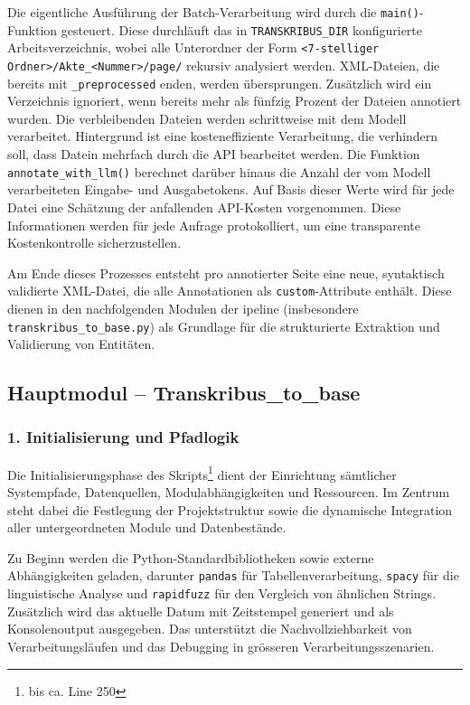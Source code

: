 \documentclass[12pt, a4paper, ngerman, bidi=default]{article}
\newcommand{\code}[1]{\colorbox{VeryLightGray}{\texttt{#1}}} %
\begin{document}
Die eigentliche Ausführung der Batch-Verarbeitung wird durch die \code{main()}-Funktion gesteuert. Diese durchläuft das in 
\code{TRANSKRIBUS\_DIR} konfigurierte Arbeitsverzeichnis, wobei alle Unterordner der Form \code{<7-stelliger Ordner>/Akte\_<Nummer>/page/} 
rekursiv analysiert werden. XML-Dateien, die bereits mit \code{\_preprocessed} enden, werden übersprungen. Zusätzlich wird ein Verzeichnis 
ignoriert, wenn bereits mehr als fünfzig Prozent der Dateien annotiert wurden. Die verbleibenden Dateien werden schrittweise mit dem Modell 
verarbeitet. Hintergrund ist eine kosteneffiziente Verarbeitung, die verhindern soll, dass Datein mehrfach durch die API bearbeitet werden. Die Funktion 
\code{annotate\_with\_llm()} berechnet darüber hinaus die Anzahl der vom Modell verarbeiteten Eingabe- und Ausgabetokens. Auf Basis dieser Werte wird für 
jede Datei eine Schätzung der anfallenden API-Kosten vorgenommen. Diese Informationen werden für jede Anfrage protokolliert, um eine transparente 
Kostenkontrolle sicherzustellen.

Am Ende dieses Prozesses entsteht pro annotierter Seite eine neue, syntaktisch validierte XML-Datei, 
die alle Annotationen als \code{custom}-Attribute enthält. Diese dienen in den nachfolgenden Modulen der 
ipeline (insbesondere \code{transkribus\_to\_base.py}) als Grundlage für die strukturierte Extraktion und Validierung von Entitäten.


\subsection{Hauptmodul -- Transkribus\_to\_base}\label{sec:transkribus_to_base}
\subsubsection*{1. Initialisierung und Pfadlogik}

Die Initialisierungsphase des Skripts\footnote{bis ca. Line 250} dient der Einrichtung sämtlicher Systempfade, Datenquellen, 
Modulabhängigkeiten und Ressourcen. Im Zentrum steht dabei die Festlegung der Projektstruktur sowie die dynamische Integration 
aller untergeordneten Module und Datenbestände.

Zu Beginn werden die Python-Standardbibliotheken sowie externe Abhängigkeiten geladen, darunter \code{pandas} für 
Tabellenverarbeitung, \code{spacy} für die linguistische Analyse und \code{rapidfuzz} für den Vergleich von ähnlichen Strings. Zusätzlich 
wird das aktuelle Datum mit Zeitstempel generiert und als Konsolenoutput ausgegeben. Das unterstützt die Nachvollziehbarkeit von
Verarbeitungsläufen und das Debugging in grösseren Verarbeitungsszenarien.
\end{document}
